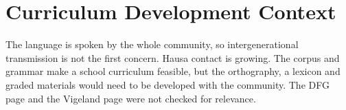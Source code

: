 \documentclass[12pt]{article}
\begin{document}
\section{Curriculum Development Context}
The language is spoken by the whole community, so intergenerational transmission is not the first concern. Hausa contact is growing. The corpus and grammar make a school curriculum feasible, but the orthography, a lexicon and graded materials would need to be developed with the community. The DFG page and the Vigeland page were not checked for relevance.
\end{document}
